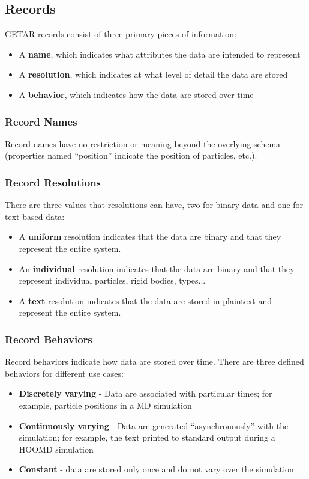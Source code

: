 \documentclass{article}
\begin{document}
\subsection{Records}
GETAR records consist of three primary pieces of information:

\begin{itemize}
\item A \textbf{name}, which indicates what attributes the data are intended to represent
\item A \textbf{resolution}, which indicates at what level of detail the data are stored
\item A \textbf{behavior}, which indicates how the data are stored over time
\end{itemize}

\subsubsection{Record Names}
Record names have no restriction or meaning beyond the overlying schema (properties named ``position'' indicate the position of particles, etc.).

\subsubsection{Record Resolutions}
There are three values that resolutions can have, two for binary data and one for text-based data:

\begin{itemize}
\item A \textbf{uniform} resolution indicates that the data are binary and that they represent the entire system.
\item An \textbf{individual} resolution indicates that the data are binary and that they represent individual particles, rigid bodies, types...
\item A \textbf{text} resolution indicates that the data are stored in plaintext and represent the entire system.
\end{itemize}

\subsubsection{Record Behaviors}
Record behaviors indicate how data are stored over time.
There are three defined behaviors for different use cases:

\begin{itemize}
\item \textbf{Discretely varying} - Data are associated with particular times; for example, particle positions in a MD simulation
\item \textbf{Continuously varying} - Data are generated ``asynchronously'' with the simulation; for example, the text printed to standard output during a HOOMD simulation
\item \textbf{Constant} - data are stored only once and do not vary over the simulation
\end{itemize}
\end{document}

